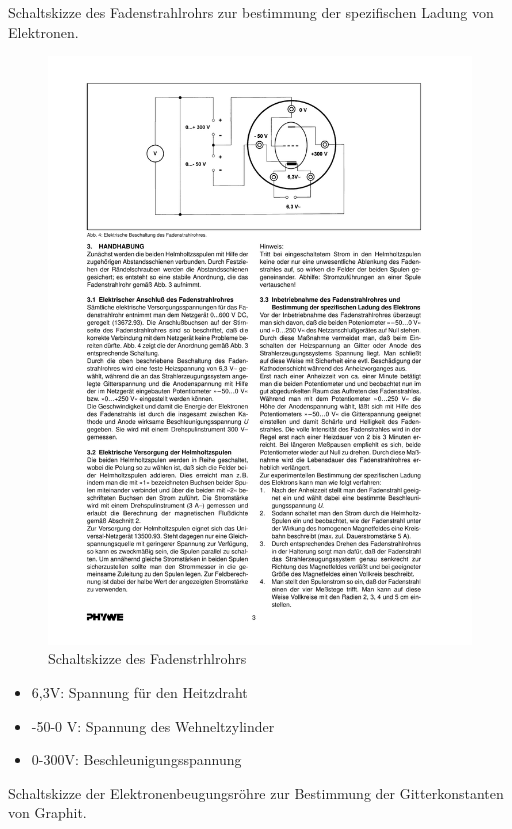 \documentclass[12pt,a4paper]{article}
\begin{document}
Schaltskizze des Fadenstrahlrohrs zur bestimmung der spezifischen Ladung von Elektronen.

\begin{figure}[H] 
  \centering
    \includegraphics[trim = 10mm 210mm 10mm 10mm, clip, scale = 1]{fadenstrahlrohr.pdf}
  	\caption[Schaltskizze des Fadenstrhlrohrs]{Schaltskizze des Fadenstrhlrohrs\footnotemark}
  \label{fig:aufbau_h}
\end{figure}

\begin{itemize}
\item	6,3V:		Spannung für den Heitzdraht

\item	-50-0 V:	Spannung des Wehneltzylinder

\item	0-300V:		Beschleunigungsspannung
\end{itemize}
\newpage
Schaltskizze der Elektronenbeugungsröhre zur Bestimmung der Gitterkonstanten von Graphit.
\end{document}
